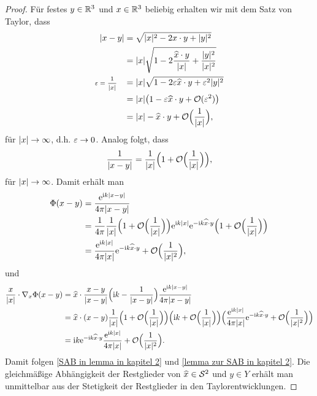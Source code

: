 \begin{proof}
	Für festes \(y\in\mathbb{R}^3\) und \(x\in\mathbb{R}^3\) beliebig erhalten wir mit dem Satz von Taylor, dass
	\begin{align*}
		|x-y|&=\sqrt{|x|^2-2x\cdot y+|y|^2}\\
		&=|x|\sqrt{1-2\frac{\widehat{x}\cdot y}{|x|}+\frac{|y|^2}{|x|^2}}\\
		\text{\scriptsize\(\varepsilon=\frac{1}{|x|}\normalsize\)}\;\;\;&=|x|\sqrt{1-2\varepsilon\widehat{x}\cdot y+\varepsilon^2|y|^2}\\
		&=|x|\big(1-\varepsilon\widehat{x}\cdot y+\mathcal{O}(\varepsilon^2)\big)\\
		&=|x|-\widehat{x}\cdot y+\mathcal{O}\Big(\frac{1}{|x|}\Big),
	\end{align*}
	für \(|x|\rightarrow\infty\), d.h. \(\varepsilon\rightarrow0\). Analog folgt, dass
	\begin{equation*}
		\frac{1}{|x-y|}=\frac{1}{|x|}\Big(1+\mathcal{O}\Big(\frac{1}{|x|}\Big)\Big),
	\end{equation*}
	für \(|x|\rightarrow\infty\). Damit erhält man
	\begin{align*}
		\Phi(x-y)&=\frac{\mathrm{e}^{\mathrm{i} k|x-y|}}{4\pi|x-y|}\\
		&=\frac{1}{4\pi}\frac{1}{|x|}\Big(1+\mathcal{O}\Big(\frac{1}{|x|}\Big)\Big)\mathrm{e}^{\mathrm{i} k|x|}\mathrm{e}^{-\mathrm{i} k\widehat{x}\cdot y}\Big(1+\mathcal{O}\Big(\frac{1}{|x|}\Big)\Big)\\
		&=\frac{\mathrm{e}^{\mathrm{i} k|x|}}{4\pi|x|}\mathrm{e}^{-\mathrm{i} k\widehat{x}\cdot y}+\mathcal{O}\Big(\frac{1}{|x|^2}\Big),
	\end{align*}
	und
	\begin{equation}
		\label{beweis lemma kapitel 2}
		\begin{aligned}
			\frac{x}{|x|}\cdot\nabla_x\Phi(x-y)
			&=\widehat{x}\cdot\frac{x-y}{|x-y|}\Big(\mathrm{i} k-\frac{1}{|x-y|}\Big)\frac{\mathrm{e}^{\mathrm{i} k|x-y|}}{4\pi|x-y|}\\
			&=\widehat{x}\cdot(x-y)\frac{1}{|x|}\Big(1+\mathcal{O}\Big(\frac{1}{|x|}\Big)\Big)\Big(\mathrm{i} k+\mathcal{O}\Big(\frac{1}{|x|}\Big)\Big)\Big(\frac{\mathrm{e}^{\mathrm{i} k|x|}}{4\pi|x|}\mathrm{e}^{-\mathrm{i} k\widehat{x}\cdot y}+\mathcal{O}\Big(\frac{1}{|x|^2}\Big)\Big)\\
			&=\mathrm{i} k\mathrm{e}^{-\mathrm{i} k\widehat{x}\cdot y}\frac{\mathrm{e}^{\mathrm{i} k|x|}}{4\pi|x|}+\mathcal{O}\Big(\frac{1}{|x|^2}\Big).
		\end{aligned}
	\end{equation}
	Damit folgen \eqref{SAB in lemma in kapitel 2} und \eqref{lemma zur SAB in kapitel 2}. Die gleichmäßige Abhängigkeit der Restglieder von \(\widehat{x}\in\mathcal{S}^2\) und \(y\in Y\) erhält man unmittelbar aus der Stetigkeit der Restglieder in den Taylorentwicklungen.
\end{proof}
